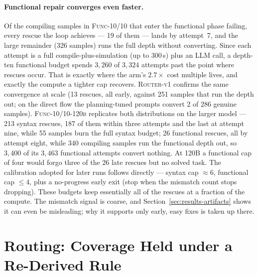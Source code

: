\paragraph{Functional repair converges even faster.}
Of the compiling samples in \textsc{Func-10/10} that enter the functional
phase failing, every rescue the loop achieves --- 19 of them --- lands by
attempt~7, and the large remainder (326 samples) runs the full depth
without converting. Since each attempt is a full compile-plus-simulation
(up to 300\,s) plus an LLM call, a depth-ten functional budget spends
$3{,}260$ of $3{,}324$ attempts past the point where rescues occur.
That is exactly where the arm's $2.7\times$ cost multiple lives, and
exactly the compute a tighter cap recovers. \textsc{Router-v1} confirms
the same convergence at scale (13 rescues, all early, against 251
samples that run the depth out; on the direct flow the planning-tuned
prompts convert 2 of 286 genuine samples). \textsc{Func-10/10-120b}
replicates both distributions on the larger model --- 213 syntax
rescues, 187 of them within three attempts and the last at attempt
nine, while 55 samples burn the full syntax budget; 26 functional
rescues, all by attempt eight, while 340 compiling samples run the
functional depth out, so $3{,}400$ of its $3{,}463$ functional
attempts convert nothing. At 120B a functional cap of four would
forgo three of the 26 late rescues but no solved task. The
calibration adopted for later runs
follows directly --- syntax cap ${\approx}6$, functional cap ${\leq}4$,
plus a no-progress early exit (stop when the mismatch count stops
dropping). These budgets keep essentially all of the rescues at a
fraction of the compute. The mismatch signal is coarse, and Section~\ref{sec:results-artifacts}
shows it can even be misleading; why it supports only early, easy
fixes is taken up there.

\section{Routing: Coverage Held under a Re-Derived Rule}
\label{sec:results-routing}

